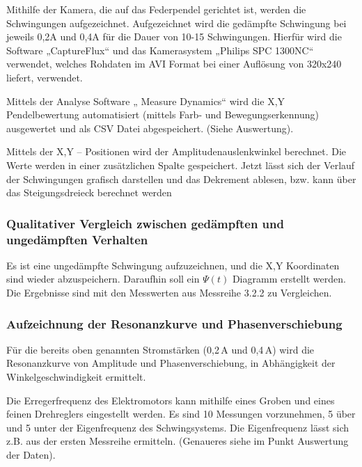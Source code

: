 \documentclass[fontsize=12pt]{scrartcl}
\begin{document}
Mithilfe der Kamera, die auf das Federpendel gerichtet ist, werden die Schwingungen aufgezeichnet. Aufgezeichnet wird die gedämpfte Schwingung bei jeweils 0,2A und 0,4A für die Dauer von 10-15 Schwingungen. Hierfür wird die Software „CaptureFlux“ und das Kamerasystem „Philips SPC 1300NC“ verwendet, welches Rohdaten im AVI Format bei einer Auflösung von 320x240 liefert, verwendet. \par

Mittels der Analyse Software „ Measure Dynamics“ wird die X,Y Pendelbewertung automatisiert (mittels Farb- und Bewegungserkennung) ausgewertet und als CSV Datei abgespeichert. (Siehe Auswertung). \par

Mittels der X,Y – Positionen wird der Amplitudenauslenkwinkel berechnet. Die Werte werden in einer zusätzlichen Spalte gespeichert.
Jetzt lässt sich der Verlauf der Schwingungen grafisch darstellen und das Dekrement ablesen, bzw. kann über das Steigungsdreieck berechnet werden

\subsubsection{Qualitativer Vergleich zwischen gedämpften und ungedämpften Verhalten}

Es ist eine ungedämpfte Schwingung aufzuzeichnen, und die X,Y Koordinaten sind wieder abzuspeichern. Daraufhin soll ein $\Psi(t)$ Diagramm erstellt werden. Die Ergebnisse sind mit den Messwerten aus Messreihe 3.2.2 zu Vergleichen.

\newpage

\subsubsection{Aufzeichnung der Resonanzkurve und Phasenverschiebung}

Für die bereits oben genannten Stromstärken (0,2\,A und 0,4\,A) wird die Resonanzkurve von Amplitude und Phasenverschiebung, in Abhängigkeit der Winkelgeschwindigkeit ermittelt. \par

Die Erregerfrequenz des Elektromotors kann mithilfe eines Groben und eines feinen Drehreglers eingestellt werden. Es sind 10 Messungen vorzunehmen, 5 über und 5 unter der Eigenfrequenz des Schwingsystems. Die Eigenfrequenz lässt sich z.B. aus der ersten Messreihe ermitteln. (Genaueres siehe im Punkt Auswertung der Daten). \par
\end{document}
